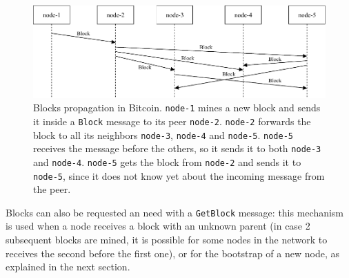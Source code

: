 \begin{figure}[ht]
	\centering
	\vspace*{0.4cm}
	\includegraphics[scale=1.04]{figures/block_propagation}
	\vspace*{0.25cm}
	\caption[Blocks propagation in Bitcoin]{
		Blocks propagation in Bitcoin.
		\texttt{node-1} mines a new block and sends it inside a \texttt{Block} message to its peer \texttt{node-2}.
		\texttt{node-2} forwards the block to all its neighbors \texttt{node-3}, \texttt{node-4} and \texttt{node-5}.
		\texttt{node-5} receives the message before the others, so it sends it to both \texttt{node-3} and \texttt{node-4}.
		\texttt{node-5} gets the block from \texttt{node-2} and sends it to \texttt{node-5}, since it does not know yet about the incoming message from the peer.
	}
	\label{fig:block-propagation}
\end{figure}

\bigskip
Blocks can also be requested an need with a \texttt{GetBlock} message:
this mechanism is used when a node receives a block with an unknown parent (in case \num{2} subsequent blocks are mined, it is possible for some nodes in the network to receives the second before the first one), or for the bootstrap of a new node, as explained in the next section.

